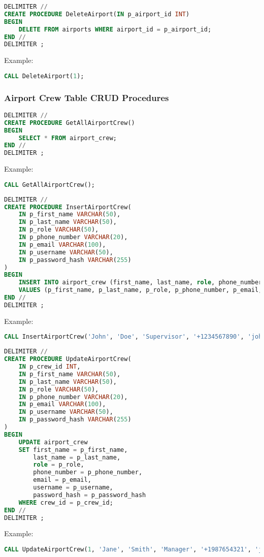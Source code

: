 \documentclass[a4paper,12pt]{article}
\begin{document}
\begin{lstlisting}[language=SQL, caption=DeleteAirport Stored Procedure]
DELIMITER //
CREATE PROCEDURE DeleteAirport(IN p_airport_id INT)
BEGIN
    DELETE FROM airports WHERE airport_id = p_airport_id;
END //
DELIMITER ;
\end{lstlisting}
Example:
\begin{lstlisting}[language=SQL]
CALL DeleteAirport(1);
\end{lstlisting}

\subsubsection{Airport Crew Table CRUD Procedures}

\begin{lstlisting}[language=SQL, caption=GetAllAirportCrew Stored Procedure]
DELIMITER //
CREATE PROCEDURE GetAllAirportCrew()
BEGIN
    SELECT * FROM airport_crew;
END //
DELIMITER ;
\end{lstlisting}
Example:
\begin{lstlisting}[language=SQL]
CALL GetAllAirportCrew();
\end{lstlisting}

\begin{lstlisting}[language=SQL, caption=InsertAirportCrew Stored Procedure]
DELIMITER //
CREATE PROCEDURE InsertAirportCrew(
    IN p_first_name VARCHAR(50),
    IN p_last_name VARCHAR(50),
    IN p_role VARCHAR(50),
    IN p_phone_number VARCHAR(20),
    IN p_email VARCHAR(100),
    IN p_username VARCHAR(50),
    IN p_password_hash VARCHAR(255)
)
BEGIN
    INSERT INTO airport_crew (first_name, last_name, role, phone_number, email, username, password_hash)
    VALUES (p_first_name, p_last_name, p_role, p_phone_number, p_email, p_username, p_password_hash);
END //
DELIMITER ;
\end{lstlisting}
Example:
\begin{lstlisting}[language=SQL]
CALL InsertAirportCrew('John', 'Doe', 'Supervisor', '+1234567890', 'john.doe@example.com', 'johndoe', 'hashedpassword');
\end{lstlisting}

\begin{lstlisting}[language=SQL, caption=UpdateAirportCrew Stored Procedure]
DELIMITER //
CREATE PROCEDURE UpdateAirportCrew(
    IN p_crew_id INT,
    IN p_first_name VARCHAR(50),
    IN p_last_name VARCHAR(50),
    IN p_role VARCHAR(50),
    IN p_phone_number VARCHAR(20),
    IN p_email VARCHAR(100),
    IN p_username VARCHAR(50),
    IN p_password_hash VARCHAR(255)
)
BEGIN
    UPDATE airport_crew
    SET first_name = p_first_name,
        last_name = p_last_name,
        role = p_role,
        phone_number = p_phone_number,
        email = p_email,
        username = p_username,
        password_hash = p_password_hash
    WHERE crew_id = p_crew_id;
END //
DELIMITER ;
\end{lstlisting}
Example:
\begin{lstlisting}[language=SQL]
CALL UpdateAirportCrew(1, 'Jane', 'Smith', 'Manager', '+1987654321', 'jane.smith@example.com', 'janesmith', 'newhash');
\end{lstlisting}
\end{document}
